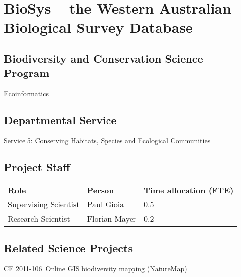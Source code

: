 \documentclass[version=last,
    paper=a4,                               %
    10pt,                                   %
    dvipsnames,
    oneside,                              %
    headings=openany,                       %
    open=any,
    BCOR=7mm,                               %
    DIV=15,     %
]{scrbook}
\begin{document}
\frontmatter
\maketitle
\mainmatter



\section*{BioSys -- the Western Australian Biological Survey Database
}



\subsection*{Biodiversity and Conservation Science Program}

Ecoinformatics




\subsection*{Departmental Service}

Service 5: Conserving Habitats, Species and Ecological Communities


\subsection*{Project Staff}
\begin{tabu} {X X X}
\textbf{Role} & \textbf{Person} & \textbf{Time allocation (FTE)}\\

Supervising Scientist & Paul Gioia & 0.5\\

Research Scientist & Florian Mayer & 0.2\\

\end{tabu}




\subsection*{Related Science Projects}

CF 2011-106~Online GIS biodiversity mapping (NatureMap)
\end{document}
